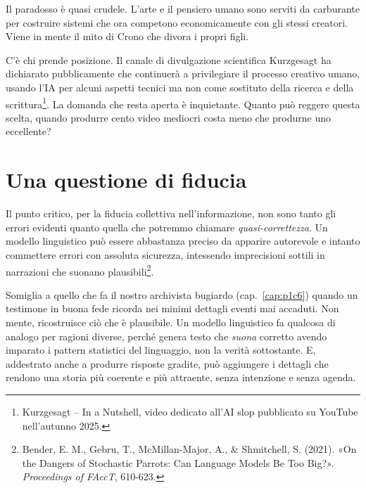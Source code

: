 Il paradosso è quasi crudele. L'arte e il pensiero umano sono serviti da carburante per costruire sistemi che ora competono economicamente con gli stessi creatori. Viene in mente il mito di Crono che divora i propri figli.

C'è chi prende posizione. Il canale di divulgazione scientifica Kurzgesagt ha dichiarato pubblicamente che continuerà a privilegiare il processo creativo umano, usando l'IA per alcuni aspetti tecnici ma non come sostituto della ricerca e della scrittura\footnote{Kurzgesagt -- In a Nutshell, video dedicato all'AI slop pubblicato su YouTube nell'autunno 2025.}. La domanda che resta aperta è inquietante. Quanto può reggere questa scelta, quando produrre cento video mediocri costa meno che produrne uno eccellente?

\section{Una questione di fiducia}

Il punto critico, per la fiducia collettiva nell'informazione, non sono tanto gli errori evidenti quanto quella che potremmo chiamare \textit{quasi-correttezza}. Un modello linguistico può essere abbastanza preciso da apparire autorevole e intanto commettere errori con assoluta sicurezza, intessendo imprecisioni sottili in narrazioni che suonano plausibili\footnote{Bender, E. M., Gebru, T., McMillan-Major, A., \& Shmitchell, S. (2021). «On the Dangers of Stochastic Parrots: Can Language Models Be Too Big?». \textit{Proceedings of FAccT}, 610-623.}.

Somiglia a quello che fa il nostro archivista bugiardo (cap.~\ref{cap:p1c6}) quando un testimone in buona fede ricorda nei minimi dettagli eventi mai accaduti. Non mente, ricostruisce ciò che è plausibile. Un modello linguistico fa qualcosa di analogo per ragioni diverse, perché genera testo che \textit{suona} corretto avendo imparato i pattern statistici del linguaggio, non la verità sottostante. E, addestrato anche a produrre risposte gradite, può aggiungere i dettagli che rendono una storia più coerente e più attraente, senza intenzione e senza agenda.


